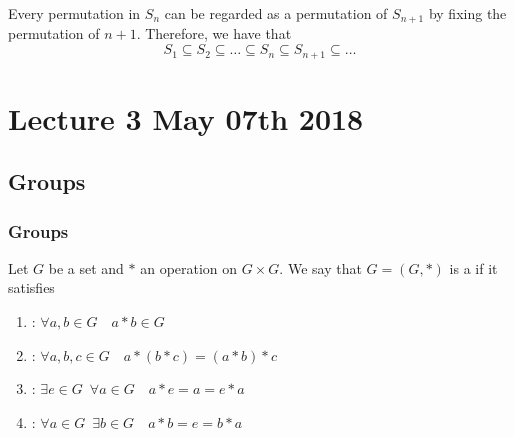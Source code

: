 \documentclass[notoc,notitlepage]{tufte-book}
\begin{document}
\begin{note}[Convention]
 Every permutation in $S_n$ can be regarded as a permutation of $S_{n + 1}$ by fixing the permutation of $n + 1$. Therefore, we have that
 \begin{equation*}
   S_1 \subseteq S_2 \subseteq \hdots \subseteq S_n \subseteq S_{n + 1} \subseteq \hdots
 \end{equation*}
\end{note}




\chapter{Lecture 3 May 07th 2018}
  \label{chapter:lecture_3_may_07th_2018}

\section{Groups} %
\label{sec:groups}

\subsection{Groups} %
\label{sub:groups}

\begin{defn}[Groups]\label{defn:groups}
  Let $G$ be a set and $*$ an operation on $G \times G$. We say that $G = (G, *)$ is a  if it satisfies
  \begin{enumerate}
    \item {}: $\forall a, b \in G \quad a * b \in G$
    \item {}: $\forall a, b, c \in G \quad a * (b * c) = (a * b) * c$
    \item {}: $\exists e \in G \enspace \forall a \in G \quad a * e = a = e * a$
    \item {}: $\forall a \in G \enspace \exists b \in G \quad a * b = e = b * a$
  \end{enumerate}
\end{defn}
\end{document}
